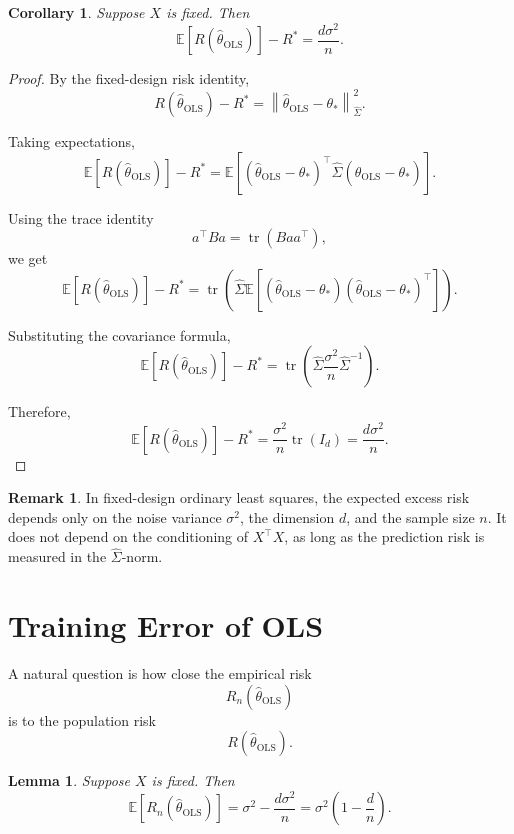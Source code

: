 \documentclass[12pt,oneside]{book}
\numberwithin{equation}{section}
\theoremstyle{definition}
\newtheorem{remark}{Remark}[section]
\theoremstyle{plain}
\newtheorem{lemma}{Lemma}[section]
\newtheorem{corollary}{Corollary}[section]
\theoremstyle{remark}
\newcommand{\E}{\mathbb{E}}
\newcommand{\norm}[1]{\left\lVert #1 \right\rVert}
\newcommand{\tr}{\operatorname{tr}}
\begin{document}
\begin{corollary}
Suppose $X$ is fixed. Then
\[
\E[R(\widehat{\theta}_{\mathrm{OLS}})]-R^*
=
\frac{d\sigma^2}{n}.
\]
\end{corollary}

\begin{proof}
By the fixed-design risk identity,
\[
R(\widehat{\theta}_{\mathrm{OLS}})-R^*
=
\norm{\widehat{\theta}_{\mathrm{OLS}}-\theta_*}_{\widehat{\Sigma}}^2.
\]

Taking expectations,
\[
\E[R(\widehat{\theta}_{\mathrm{OLS}})]-R^*
=
\E\left[
(\widehat{\theta}_{\mathrm{OLS}}-\theta_*)^\top
\widehat{\Sigma}
(\widehat{\theta}_{\mathrm{OLS}}-\theta_*)
\right].
\]

Using the trace identity
\[
a^\top Ba=\tr(Baa^\top),
\]
we get
\[
\E[R(\widehat{\theta}_{\mathrm{OLS}})]-R^*
=
\tr\left(
\widehat{\Sigma}
\E[
(\widehat{\theta}_{\mathrm{OLS}}-\theta_*)
(\widehat{\theta}_{\mathrm{OLS}}-\theta_*)^\top
]
\right).
\]

Substituting the covariance formula,
\[
\E[R(\widehat{\theta}_{\mathrm{OLS}})]-R^*
=
\tr\left(
\widehat{\Sigma}
\frac{\sigma^2}{n}\widehat{\Sigma}^{-1}
\right).
\]

Therefore,
\[
\E[R(\widehat{\theta}_{\mathrm{OLS}})]-R^*
=
\frac{\sigma^2}{n}\tr(I_d)
=
\frac{d\sigma^2}{n}.
\]
\end{proof}

\begin{remark}
In fixed-design ordinary least squares, the expected excess risk depends only on the noise variance $\sigma^2$, the dimension $d$, and the sample size $n$. It does not depend on the conditioning of $X^\top X$, as long as the prediction risk is measured in the $\widehat{\Sigma}$-norm.
\end{remark}

\section{Training Error of OLS}

A natural question is how close the empirical risk
\[
R_n(\widehat{\theta}_{\mathrm{OLS}})
\]
is to the population risk
\[
R(\widehat{\theta}_{\mathrm{OLS}}).
\]

\begin{lemma}
Suppose $X$ is fixed. Then
\[
\E[R_n(\widehat{\theta}_{\mathrm{OLS}})]
=
\sigma^2-\frac{d\sigma^2}{n}
=
\sigma^2\left(1-\frac{d}{n}\right).
\]
\end{lemma}
\end{document}

